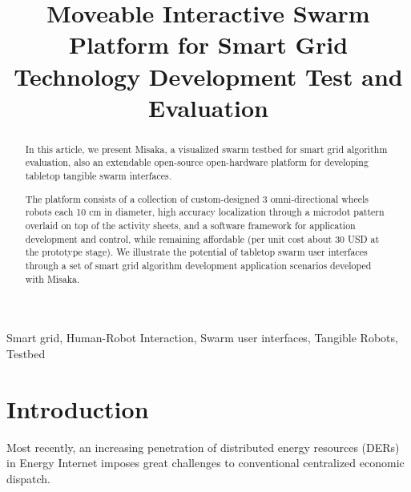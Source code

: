 \documentclass[conference]{IEEEtran}
\begin{document}
\title{Moveable Interactive Swarm Platform for Smart Grid Technology Development Test and Evaluation\\}

\author{
\and
{}
}

\maketitle

\begin{abstract}
    In this article, we present Misaka, a visualized swarm testbed for smart grid algorithm evaluation, also an extendable open-source open-hardware platform for developing tabletop tangible swarm interfaces\cite{yan2019consensus}.

    The platform consists of a collection of custom-designed 3 omni-directional wheels robots each 10 cm in diameter, high accuracy localization through a microdot pattern overlaid on top of the activity sheets, and a software framework for application development and control, while remaining affordable (per unit cost about 30 USD at the prototype stage). We illustrate the potential of tabletop swarm user interfaces through a set of smart grid algorithm development application scenarios developed with Misaka.
\end{abstract}

\begin{IEEEkeywords}
    Smart grid, Human-Robot Interaction, Swarm user interfaces, Tangible Robots, Testbed
\end{IEEEkeywords}

\section{Introduction}

Most recently, an increasing penetration of distributed energy resources (DERs) in Energy Internet imposes great challenges to conventional centralized economic dispatch\cite{yan2019consensus}.
\end{document}
